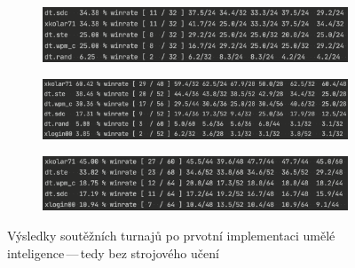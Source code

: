 \documentclass[11pt, a4paper]{article}
\theoremstyle{definition}
\begin{document}
\begin{figure}[H]
    \centering
    \begin{subfigure}{\textwidth}
        \centering
        \includegraphics[width=\linewidth]{tournament-1.png}
        \vspace{0mm}
    \end{subfigure}
    \begin{subfigure}{\textwidth}
        \centering
        \includegraphics[width=\linewidth]{tournament-3.png}
        \vspace{0mm}
    \end{subfigure}
    \begin{subfigure}{\textwidth}
        \centering
        \includegraphics[width=\linewidth]{tournament-2.png}
    \end{subfigure}
    \caption{Výsledky soutěžních turnajů po prvotní implementaci umělé inteligence\,---\,tedy bez strojového učení}
    \label{fig:vysledky-turnaje-bez-modelu}
\end{figure}
\end{document}
